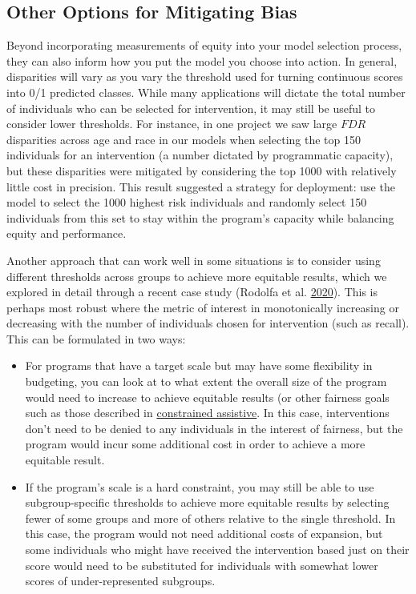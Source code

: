 \documentclass[]{krantz}
\begin{document}
\subsection{Other Options for Mitigating
Bias}\label{other-options-for-mitigating-bias}

Beyond incorporating measurements of equity into your model selection
process, they can also inform how you put the model you choose into
action. In general, disparities will vary as you vary the threshold used
for turning continuous scores into 0/1 predicted classes. While many
applications will dictate the total number of individuals who can be
selected for intervention, it may still be useful to consider lower
thresholds. For instance, in one project we saw large \(FDR\)
disparities across age and race in our models when selecting the top 150
individuals for an intervention (a number dictated by programmatic
capacity), but these disparities were mitigated by considering the top
1000 with relatively little cost in precision. This result suggested a
strategy for deployment: use the model to select the 1000 highest risk
individuals and randomly select 150 individuals from this set to stay
within the program's capacity while balancing equity and performance.

Another approach that can work well in some situations is to consider
using different thresholds across groups to achieve more equitable
results, which we explored in detail through a recent case study
(Rodolfa et al. \protect\hyperlink{ref-Rodolfa2020}{2020}). This is
perhaps most robust where the metric of interest in monotonically
increasing or decreasing with the number of individuals chosen for
intervention (such as recall). This can be formulated in two ways:

\begin{itemize}
\item
  For programs that have a target scale but may have some flexibility in
  budgeting, you can look at to what extent the overall size of the
  program would need to increase to achieve equitable results (or other
  fairness goals such as those described in
  \protect\hyperlink{sec:constrainedassistive}{constrained assistive}.
  In this case, interventions don't need to be denied to any individuals
  in the interest of fairness, but the program would incur some
  additional cost in order to achieve a more equitable result.
\item
  If the program's scale is a hard constraint, you may still be able to
  use subgroup-specific thresholds to achieve more equitable results by
  selecting fewer of some groups and more of others relative to the
  single threshold. In this case, the program would not need additional
  costs of expansion, but some individuals who might have received the
  intervention based just on their score would need to be substituted
  for individuals with somewhat lower scores of under-represented
  subgroups.
\end{itemize}
\end{document}
